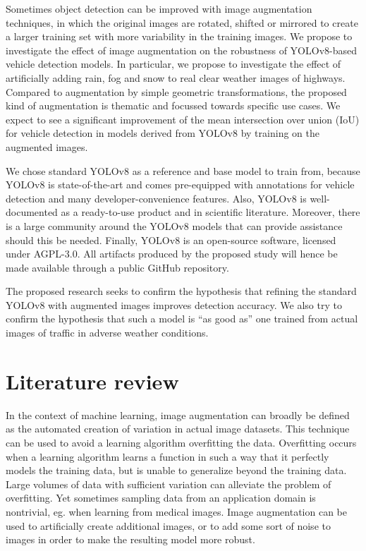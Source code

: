\documentclass[]{article}
\begin{document}
	Sometimes object detection can be improved with image augmentation techniques, in which the original images are rotated, shifted or mirrored to create a larger training set with more variability in the training images.	We propose to investigate the effect of image augmentation on the robustness of YOLO{\small v8}-based vehicle detection models. In particular, we propose to investigate the effect of artificially adding rain, fog and snow to real clear weather images of highways. Compared to augmentation by simple geometric transformations, the proposed kind of augmentation is thematic and focussed towards specific use cases. We expect to see a significant improvement of the mean intersection over union (IoU) for vehicle detection in models derived from YOLO{\small v8} by training on the augmented images. 
	
	We chose standard YOLO{\small v8} as a reference and base model to train from, because YOLO{\small v8} is state-of-the-art and comes pre-equipped with annotations for vehicle detection and many developer-convenience features. Also, YOLO{\small v8} is well-documented as a ready-to-use product and in scientific literature. Moreover, there is a large community around the YOLO{\small v8} models that can provide assistance should this be needed. Finally, YOLO{\small v8} is an open-source software, licensed under AGPL-3.0. All artifacts produced by the proposed study will hence be made available through a public GitHub repository.  
	
	The proposed research seeks to confirm the hypothesis that refining the standard YOLO{\small v8} with augmented images improves detection accuracy. We also try to confirm the hypothesis that such a model is ``as good as'' one trained from actual images of traffic in adverse weather conditions.

\section{Literature review}

	In the context of machine learning, image augmentation can broadly be defined as the automated creation of variation in actual image datasets. This technique can be used to avoid a learning algorithm overfitting the data. Overfitting occurs when a learning algorithm learns a function in such a way that it perfectly models the training data, but is unable to generalize beyond the training data. Large volumes of data with sufficient variation can alleviate the problem of overfitting. Yet sometimes sampling data from an application domain is nontrivial, eg. when learning from medical images.  Image augmentation can be used to artificially create additional images, or to add some sort of noise to images in order to make the resulting model more robust.
	
\end{document}
